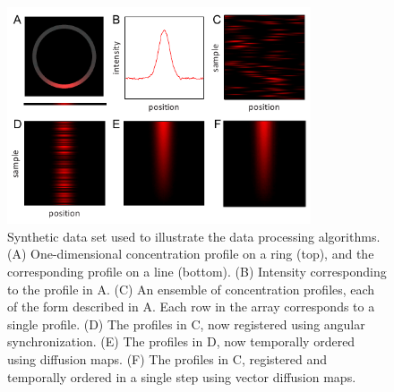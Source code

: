 \begin{figure}
\centering
\includegraphics[width=0.8\textwidth]{ch-drosophila/figures/figS2}
\caption[Synthetic data set used to illustrate registration and ordering algorithms]{Synthetic data set used to illustrate the data processing algorithms. (A) One-dimensional concentration profile on a ring (top), and the corresponding profile on a line (bottom). (B) Intensity corresponding to the profile in A. (C) An ensemble of concentration profiles, each of the form described in A. Each row in the array corresponds to a single profile. {(D)} The profiles in {C}, now registered using angular synchronization. {(E)} The profiles in {D}, now temporally ordered using diffusion maps.  {(F)} The profiles in {C}, registered and temporally ordered in a single step using vector diffusion maps.}
\label{fig:1d_demo}
\end{figure}

